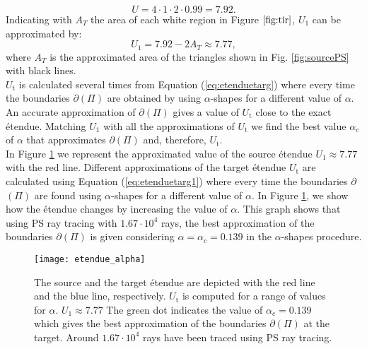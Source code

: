  \begin{equation}U = 4\cdot 1\cdot 2\cdot 0.99 = 7.92.\end{equation} Indicating with $A_{T}$ the area of each white region  in Figure $\ref{fig:tir}$, $U_1$ can be approximated by:
 \begin{equation}\label{eq:Usource}
 U_{1} = 7.92-2A_{T}\approx 7.77,
 \end{equation}
 where $A_{T}$ is the approximated area of the triangles shown in Fig. \ref{fig:sourcePS} with black lines.\\ \indent  $U_{\textrm{t}}$ is calculated several times from Equation (\ref{eq:etenduetarg}) where every time the boundaries $\partial$$(\Pi)$ are obtained by using $\alpha$-shapes for a different value of $\alpha$. An accurate approximation of $\partial$$(\Pi)$ gives a value of $U_{\textrm{t}}$ close to the exact \'{e}tendue. 
Matching $U_1$ with all the approximations of $U_{\textrm{t}}$ we find the best value $\alpha_c$ of $\alpha$ that approximates $\partial$$(\Pi)$ and, therefore, $U_{\textrm{t}}$. \\ \indent In Figure \ref{fig:etendueTS} we represent the approximated value of the source \'{e}tendue $U_1\approx 7.77$ with the red line. Different approximations of the target \'{e}tendue $U_{\textrm{t}}$ are calculated using Equation (\ref{eq:etenduetarg1}) where every time the boundaries $\partial$$(\Pi)$ are found using $\alpha$-shapes for a different value of $\alpha$. In Figure \ref{fig:etendueTS}, we show how the \'{e}tendue changes by increasing the value of $\alpha$. This graph shows that using PS ray tracing with $1.67\cdot 10^4$ rays, the best approximation of the boundaries $\partial$$(\Pi)$ is given considering $\alpha = \alpha_c = 0.139$ in the $\alpha$-shapes procedure.
 \begin{figure}[h]
  \begin{center}
  \texttt{[image: etendue\_alpha]}
  \end{center}
  \caption{\footnotesize{The source and the target \'{e}tendue are depicted with the red line and the blue line, respectively.
  $U_\textrm{t}$ is computed for a range of values for $\alpha$. $U_1 \approx 7.77$
   The green dot indicates the value of $\alpha_c = 0.139$ which gives the best approximation of the boundaries $\partial$$(\Pi)$ at the target.
   Around $1.67 \cdot 10^4$ rays have been traced using PS ray tracing.
  }}
  \label{fig:etendueTS}
\end{figure}
